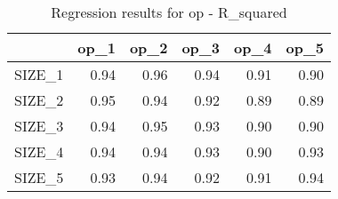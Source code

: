 \begin{table}[ht]
\centering
\caption{Regression results for op - R_squared} 
\begin{tabular}{rrrrrr}
  \hline
 & op\_1 & op\_2 & op\_3 & op\_4 & op\_5 \\ 
  \hline
SIZE\_1 & 0.94 & 0.96 & 0.94 & 0.91 & 0.90 \\ 
  SIZE\_2 & 0.95 & 0.94 & 0.92 & 0.89 & 0.89 \\ 
  SIZE\_3 & 0.94 & 0.95 & 0.93 & 0.90 & 0.90 \\ 
  SIZE\_4 & 0.94 & 0.94 & 0.93 & 0.90 & 0.93 \\ 
  SIZE\_5 & 0.93 & 0.94 & 0.92 & 0.91 & 0.94 \\ 
   \hline
\end{tabular}
\end{table}


